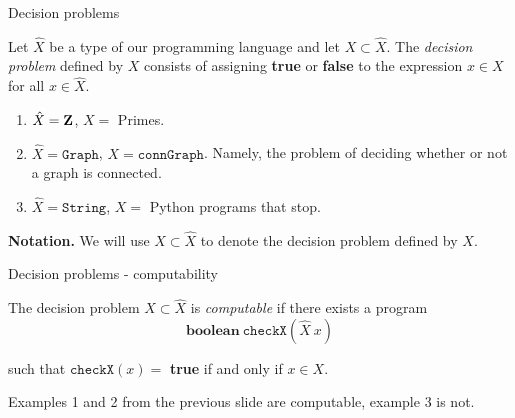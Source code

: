 %

\begin{frame}{Decision problems}
	\begin{defn}
		Let $\hat{X}$ be a type of our programming language and let
		$X \subset \hat{X}$. The \emph{decision problem} defined by $X$ consists
		of assigning \textbf{true} or \textbf{false} to the expression $x \in X$
		for all $x \in \hat{X}$. 
	\end{defn}

	\pause
	\begin{exl}
		\begin{enumerate}
			\item $\hat{X}= \mathbf{Z}$, $X=$ Primes.\pause
			\item $\hat{X}= \mathtt{Graph}$, $X= \mathtt{connGraph}$. Namely,
				the problem of deciding whether or not a graph is
				connected.\pause
			\item $\hat{X}= \mathtt{String}$, $X=$ Python programs that stop.
		\end{enumerate}
	\end{exl}

	\pause
	\textbf{Notation.} We will use $X \subset \hat{X}$ to denote the decision problem
	defined by $X$.
\end{frame}

%

\begin{frame}{Decision problems - computability}
	\begin{defn}
		The decision problem $X \subset \hat{X}$ is \emph{computable} if there
		exists a program
		\[
			\mathbf{boolean}\ \mathtt{checkX}(\hat{X}\ x)
		\]

		such that \(\mathtt{checkX}(x) =\) \textbf{true} if and only if
		$x \in X$.
	\end{defn}

	\pause
	\begin{exl}
		Examples 1 and 2 from the previous slide are computable, example 3 is
		not.
	\end{exl}
\end{frame}

%

